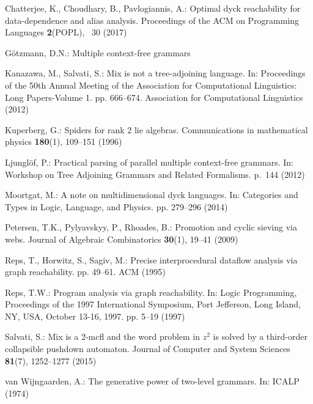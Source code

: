 \documentclass{llncs}
\begin{document}
\begin{thebibliography}{10}
\providecommand{\url}[1]{\texttt{#1}}
\providecommand{\urlprefix}{URL }
\providecommand{\doi}[1]{https://doi.org/#1}

Chatterjee, K., Choudhary, B., Pavlogiannis, A.: Optimal dyck reachability for
  data-dependence and alias analysis. Proceedings of the ACM on Programming
  Languages  \textbf{2}(POPL), ~30 (2017)

G{\"o}tzmann, D.N.: Multiple context-free grammars

Kanazawa, M., Salvati, S.: Mix is not a tree-adjoining language. In:
  Proceedings of the 50th Annual Meeting of the Association for Computational
  Linguistics: Long Papers-Volume 1. pp. 666--674. Association for
  Computational Linguistics (2012)

Kuperberg, G.: Spiders for rank 2 lie algebras. Communications in mathematical
  physics  \textbf{180}(1),  109--151 (1996)

Ljungl{\"o}f, P.: Practical parsing of parallel multiple context-free grammars.
  In: Workshop on Tree Adjoining Grammars and Related Formalisms. p.~144 (2012)

Moortgat, M.: A note on multidimensional dyck languages. In: Categories and
  Types in Logic, Language, and Physics. pp. 279--296 (2014)

Petersen, T.K., Pylyavskyy, P., Rhoades, B.: Promotion and cyclic sieving via
  webs. Journal of Algebraic Combinatorics  \textbf{30}(1),  19--41 (2009)

Reps, T., Horwitz, S., Sagiv, M.: Precise interprocedural dataflow analysis via
  graph reachability. pp. 49--61. ACM (1995)

Reps, T.W.: Program analysis via graph reachability. In: Logic Programming,
  Proceedings of the 1997 International Symposium, Port Jefferson, Long Island,
  NY, USA, October 13-16, 1997. pp. 5--19 (1997)

Salvati, S.: Mix is a 2-mcfl and the word problem in $z^2$ is solved by a
  third-order collapsible pushdown automaton. Journal of Computer and System
  Sciences  \textbf{81}(7),  1252--1277 (2015)

van Wijngaarden, A.: The generative power of two-level grammars. In: ICALP
  (1974)

\end{thebibliography}
\end{document}
